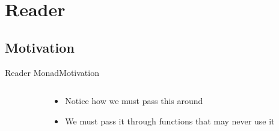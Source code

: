 \section{Reader}
\subsection{Motivation}
\begin{frame}[fragile]{Reader Monad}{Motivation}
  \begin{columns}[t]
    \begin{column}{.4\textwidth}
      {\tiny\inputminted[escapeinside=\\`\\`]{haskell}{reader-motivation.hs}}
    \end{column}
    \begin{column}{.4\textwidth}
      \begin{itemize}
        \item Notice how we must pass this \texttt{} around
        \item We must pass it through functions that may never use it
      \end{itemize}
    \end{column}
  \end{columns}
\end{frame}
